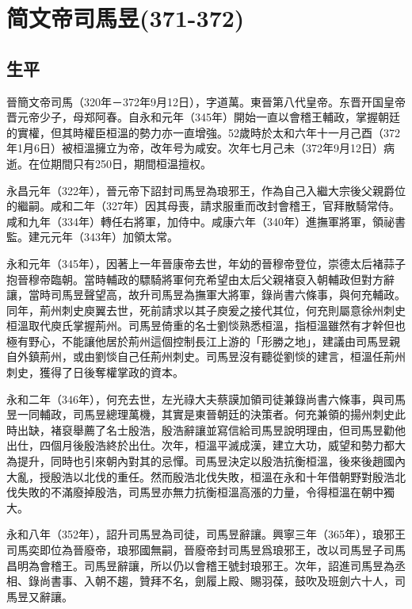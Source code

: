 
\section{简文帝司馬昱\tiny(371-372)}

\subsection{生平}

晉簡文帝司馬（320年－372年9月12日），字道萬。東晉第八代皇帝。东晋开国皇帝晋元帝少子，母郑阿春。自永和元年（345年）開始一直以會稽王輔政，掌握朝廷的實權，但其時權臣桓溫的勢力亦一直增強。52歲時於太和六年十一月己酉（372年1月6日）被桓溫擁立为帝，改年号为咸安。次年七月己未（372年9月12日）病逝。在位期間只有250日，期間桓温擅权。

永昌元年（322年），晉元帝下詔封司馬昱為琅邪王，作為自己入繼大宗後父親爵位的繼嗣。咸和二年（327年）因其母喪，請求服重而改封會稽王，官拜散騎常侍。咸和九年（334年）轉任右將軍，加侍中。咸康六年（340年）進撫軍將軍，領祕書監。建元元年（343年）加領太常。

永和元年（345年），因著上一年晉康帝去世，年幼的晉穆帝登位，崇德太后褚蒜子抱晉穆帝臨朝。當時輔政的驃騎將軍何充希望由太后父親褚裒入朝輔政但對方辭讓，當時司馬昱聲望高，故升司馬昱為撫軍大將軍，錄尚書六條事，與何充輔政。同年，荊州刺史庾翼去世，死前請求以其子庾爰之接代其位，何充則屬意徐州刺史桓溫取代庾氏掌握荊州。司馬昱倚重的名士劉惔熟悉桓溫，指桓溫雖然有才幹但也極有野心，不能讓他居於荊州這個控制長江上游的「形勝之地」，建議由司馬昱親自外鎮荊州，或由劉惔自己任荊州刺史。司馬昱沒有聽從劉惔的建言，桓溫任荊州刺史，獲得了日後奪權掌政的資本。

永和二年（346年），何充去世，左光祿大夫蔡謨加領司徒兼錄尚書六條事，與司馬昱一同輔政，司馬昱總理萬機，其實是東晉朝廷的決策者。何充兼領的揚州刺史此時出缺，褚裒舉薦了名士殷浩，殷浩辭讓並寫信給司馬昱說明理由，但司馬昱勸他出仕，四個月後殷浩終於出仕。次年，桓溫平滅成漢，建立大功，威望和勢力都大為提升，同時也引來朝內對其的忌憚。司馬昱決定以殷浩抗衡桓溫，後來後趙國內大亂，授殷浩以北伐的重任。然而殷浩北伐失敗，桓溫在永和十年借朝野對殷浩北伐失敗的不滿廢掉殷浩，司馬昱亦無力抗衡桓溫高漲的力量，令得桓溫在朝中獨大。

永和八年（352年），詔升司馬昱為司徒，司馬昱辭讓。興寧三年（365年），琅邪王司馬奕即位為晉廢帝，琅邪國無嗣，晉廢帝封司馬昱爲琅邪王，改以司馬昱子司馬昌明為會稽王。司馬昱辭讓，所以仍以會稽王號封琅邪王。次年，詔進司馬昱為丞相、錄尚書事、入朝不趨，贊拜不名，劍履上殿、賜羽葆，鼓吹及班劍六十人，司馬昱又辭讓。


